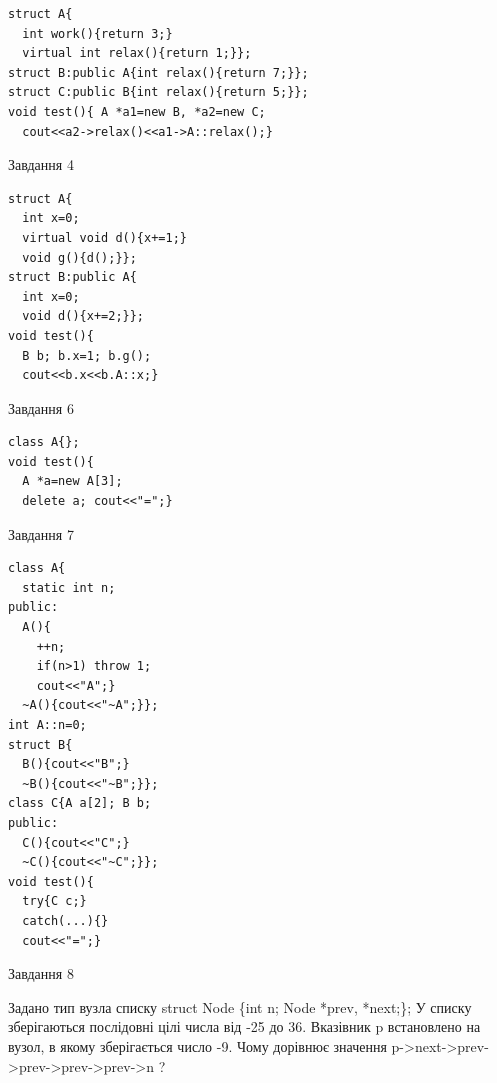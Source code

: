\documentclass[12pt, ukrainian]{article}
\begin{document}
{{{{{{{{{\begin{minipage}[t]{11cm}
\begin{verbatim}
struct A{
  int work(){return 3;}
  virtual int relax(){return 1;}};
struct B:public A{int relax(){return 7;}};
struct C:public B{int relax(){return 5;}};
void test(){ A *a1=new B, *a2=new C;
  cout<<a2->relax()<<a1->A::relax();}
\end{verbatim}            


\end{minipage}
\vline \hspace{8mm}
\begin{minipage}[t]{7cm}
               
{\begin{center}Завдання {4}\end{center}}
\vspace{-6mm}

\begin{verbatim}
struct A{
  int x=0;
  virtual void d(){x+=1;}
  void g(){d();}};
struct B:public A{
  int x=0;
  void d(){x+=2;}};
void test(){
  B b; b.x=1; b.g();
  cout<<b.x<<b.A::x;}
\end{verbatim}            


               
{\begin{center}Завдання {6}\end{center}}
\vspace{-6mm}

\begin{verbatim}
class A{};
void test(){
  A *a=new A[3]; 
  delete a; cout<<"=";} 
\end{verbatim}            


               
{\begin{center}Завдання {7}\end{center}}
\vspace{-6mm}

\begin{verbatim}
class A{
  static int n;
public:
  A(){
    ++n; 
    if(n>1) throw 1;
    cout<<"A";}
  ~A(){cout<<"~A";}};
int A::n=0;
struct B{
  B(){cout<<"B";}
  ~B(){cout<<"~B";}};
class C{A a[2]; B b;
public:
  C(){cout<<"C";}
  ~C(){cout<<"~C";}};
void test(){
  try{C c;} 
  catch(...){} 
  cout<<"=";}
\end{verbatim}            


\end{minipage}
               
{\begin{center}Завдання {8}\end{center}}
\vspace{-6mm}
Задано тип вузла списку
struct Node \{int n; Node *prev, *next;\};
У списку зберігаються послідовні цілі числа від -25 до 36. Вказівник p встановлено на вузол, в якому зберігається число -9.
Чому дорівнює значення p->next->prev->prev->prev->prev->n ?\par

}}}}}}}}}
\end{document}
